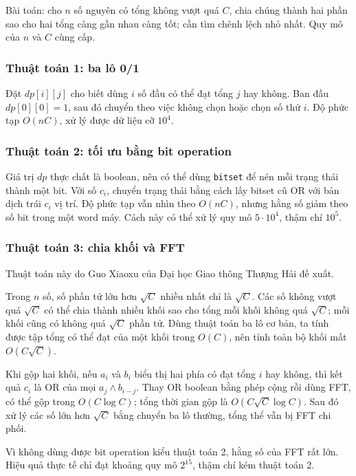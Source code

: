 \documentclass[11pt]{article}
\begin{document}
Bài toán: cho \(n\) số nguyên có tổng không vượt quá \(C\), chia chúng thành hai
phần sao cho hai tổng càng gần nhau càng tốt; cần tìm chênh lệch nhỏ nhất.
Quy mô của \(n\) và \(C\) cùng cấp.

\subsubsection{Thuật toán 1: ba lô 0/1}

Đặt \(\mathit{dp}[i][j]\) cho biết dùng \(i\) số đầu có thể đạt tổng \(j\) hay
không. Ban đầu \(\mathit{dp}[0][0]=1\), sau đó chuyển theo việc không chọn hoặc
chọn số thứ \(i\). Độ phức tạp \(O(nC)\), xử lý được dữ liệu cỡ \(10^4\).

\subsubsection{Thuật toán 2: tối ưu bằng bit operation}

Giá trị \(\mathit{dp}\) thực chất là boolean, nên có thể dùng \texttt{bitset}
để nén mỗi trạng thái thành một bit. Với số \(c_i\), chuyển trạng thái bằng
cách lấy bitset cũ OR với bản dịch trái \(c_i\) vị trí. Độ phức tạp vẫn nhìn
theo \(O(nC)\), nhưng hằng số giảm theo số bit trong một word máy. Cách này có
thể xử lý quy mô \(5\cdot10^4\), thậm chí \(10^5\).

\subsubsection{Thuật toán 3: chia khối và FFT}

Thuật toán này do Guo Xiaoxu của Đại học Giao thông Thượng Hải đề xuất.

Trong \(n\) số, số phần tử lớn hơn \(\sqrt C\) nhiều nhất chỉ là \(\sqrt C\).
Các số không vượt quá \(\sqrt C\) có thể chia thành nhiều khối sao cho tổng mỗi
khối không quá \(\sqrt C\); mỗi khối cũng có không quá \(\sqrt C\) phần tử. Dùng
thuật toán ba lô cơ bản, ta tính được tập tổng có thể đạt của một khối trong
\(O(C)\), nên tính toàn bộ khối mất \(O(C\sqrt C)\).

Khi gộp hai khối, nếu \(a_i\) và \(b_i\) biểu thị hai phía có đạt tổng \(i\) hay
không, thì kết quả \(c_i\) là OR của mọi \(a_j\land b_{i-j}\). Thay OR boolean
bằng phép cộng rồi dùng FFT, có thể gộp trong \(O(C\log C)\); tổng thời gian
gộp là \(O(C\sqrt C\log C)\). Sau đó xử lý các số lớn hơn \(\sqrt C\) bằng
chuyển ba lô thường, tổng thể vẫn bị FFT chi phối.

Vì không dùng được bit operation kiểu thuật toán 2, hằng số của FFT rất lớn.
Hiệu quả thực tế chỉ đạt khoảng quy mô \(2^{15}\), thậm chí kém thuật toán 2.
\end{document}
